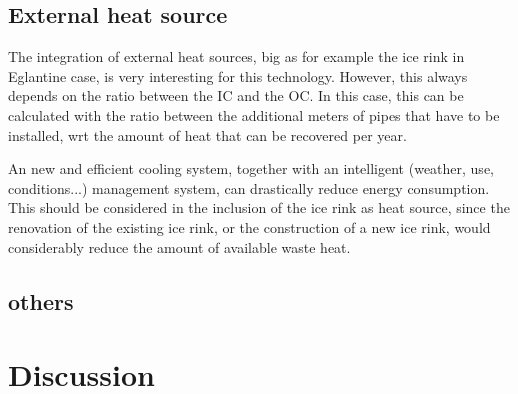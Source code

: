 \documentclass{article}
\begin{document}
\subsection{External heat source}
The integration of external heat sources, big as for example the ice rink in Eglantine case, is very interesting for this technology. However, this always depends on the ratio between the IC and the OC. In this case, this can be calculated with the ratio between the additional meters of pipes that have to be installed, wrt the amount of heat that can be recovered per year.


An new and efficient cooling system, together with an intelligent (weather, use, conditions...) management system, can drastically reduce energy consumption. This should be considered in the inclusion of the ice rink as heat source, since the renovation of the existing ice rink, or the construction of a new ice rink, would considerably reduce the amount of available waste heat.


\subsection{others}




\section{Discussion}
\end{document}
